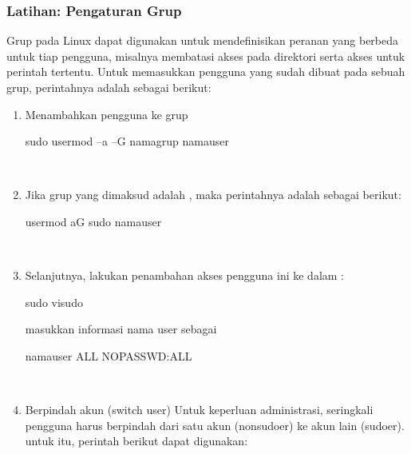 \documentclass[letterpaper,10pt,english]{sphinxmanual}
\begin{document}
\subsubsection{Latihan: Pengaturan Grup}
\label{\detokenize{sesi1/arsitektur:latihan-pengaturan-grup}}
Grup pada Linux dapat digunakan untuk mendefinisikan peranan yang berbeda untuk tiap pengguna, misalnya membatasi akses pada direktori serta akses untuk perintah tertentu. Untuk memasukkan pengguna yang sudah dibuat pada sebuah grup, perintahnya adalah sebagai berikut:
\begin{enumerate}
%
\item {} 
Menambahkan pengguna ke grup

\begin{sphinxVerbatim}[commandchars=\\\{\}]
sudo usermod –a –G namagrup namauser
\end{sphinxVerbatim}

 

\item {} 
Jika grup yang dimaksud adalah , maka perintahnya adalah sebagai berikut:

\begin{sphinxVerbatim}[commandchars=\\\{\}]
usermod \PYGZhy{}aG sudo namauser
\end{sphinxVerbatim}

 

\item {} 
Selanjutnya, lakukan penambahan akses pengguna ini ke dalam :

\begin{sphinxVerbatim}[commandchars=\\\{\}]
sudo visudo
\end{sphinxVerbatim}

masukkan informasi nama user sebagai 

\begin{sphinxVerbatim}[commandchars=\\\{\}]
namauser  ALL NOPASSWD:ALL
\end{sphinxVerbatim}

 

\item {} 
Berpindah akun (switch user)
Untuk keperluan administrasi, seringkali pengguna harus berpindah dari satu akun (non\sphinxhyphen{}sudoer) ke akun lain (sudoer). untuk itu, perintah berikut dapat digunakan:


\end{enumerate}
\end{document}

